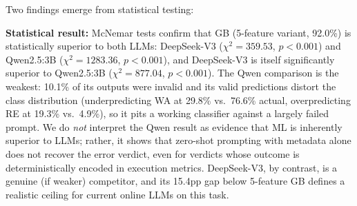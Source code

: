\documentclass[acmsmall]{acmart}
\begin{document}
\begin{table}[htbp]
\centering
\caption{McNemar test results (paired, test set $n=2{}672$; ML models use the 5-feature subset for parity with the LLMs)}
\label{tab:mcnemar}
%
\end{table}

Two findings emerge from statistical testing:

\textbf{Statistical result:} McNemar tests confirm that GB (5-feature
variant, 92.0\%) is statistically superior to both LLMs: DeepSeek-V3
($\chi^2 = 359.53$, $p < 0.001$) and Qwen2.5:3B ($\chi^2 = 1283.36$,
$p < 0.001$), and DeepSeek-V3 is itself significantly superior to Qwen2.5:3B
($\chi^2 = 877.04$, $p < 0.001$). The Qwen comparison is the weakest:
10.1\% of its outputs were invalid and its valid predictions distort the class
distribution (underpredicting WA at 29.8\% vs.\ 76.6\% actual, overpredicting
RE at 19.3\% vs.\ 4.9\%), so it pits a working classifier against a
largely failed prompt. We do \emph{not} interpret the Qwen result as evidence
that ML is inherently superior to LLMs; rather, it shows that zero-shot
prompting with metadata alone does not recover the error verdict, even for
verdicts whose outcome is deterministically encoded in execution metrics.
DeepSeek-V3, by contrast, is a genuine (if weaker) competitor, and its 15.4pp
gap below 5-feature GB defines a realistic ceiling for current online LLMs on this task.
\end{document}
